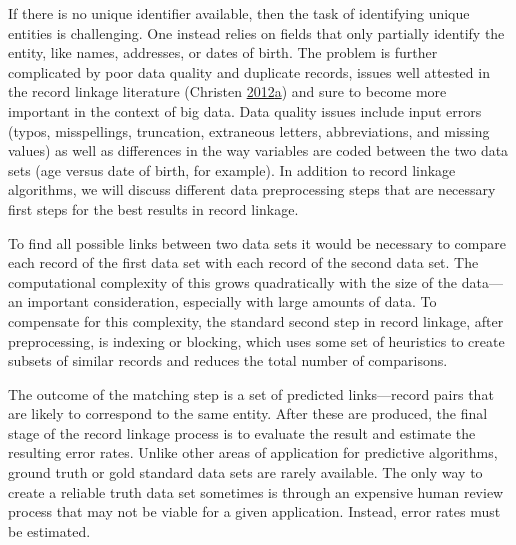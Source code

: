 \documentclass[]{krantz}
\begin{document}
If there is no unique identifier available, then the task of identifying
unique entities is challenging. One instead relies on fields that only
partially identify the entity, like names, addresses, or dates of birth.
The problem is further complicated by poor data quality and duplicate
records, issues well attested in the record linkage literature (Christen
\protect\hyperlink{ref-christen2012survey}{2012}\protect\hyperlink{ref-christen2012survey}{a})
and sure to become more important in the context of big data. Data
quality issues include input errors (typos, misspellings, truncation,
extraneous letters, abbreviations, and missing values) as well as
differences in the way variables are coded between the two data sets
(age versus date of birth, for example). In addition to record linkage
algorithms, we will discuss different data preprocessing steps that are
necessary first steps for the best results in record linkage.

To find all possible links between two data sets it would be necessary
to compare each record of the first data set with each record of the
second data set. The computational complexity of this grows
quadratically with the size of the data---an important consideration,
especially with large amounts of data. To compensate for this
complexity, the standard second step in record linkage, after
preprocessing, is indexing or blocking, which uses some set of
heuristics to create subsets of similar records and reduces the total
number of comparisons.

The outcome of the matching step is a set of predicted links---record
pairs that are likely to correspond to the same entity. After these are
produced, the final stage of the record linkage process is to evaluate
the result and estimate the resulting error rates. Unlike other areas of
application for predictive algorithms, ground truth or gold standard
data sets are rarely available. The only way to create a reliable truth
data set sometimes is through an expensive human review process that may
not be viable for a given application. Instead, error rates must be
estimated.
\end{document}
